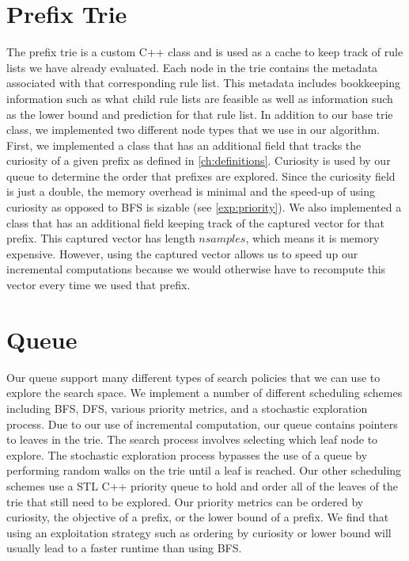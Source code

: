 \section{Prefix Trie}
The prefix trie is a custom C++ class and is used as a cache to keep track of rule lists we have already evaluated. 
Each node in the trie contains the metadata associated with that corresponding rule list. 
This metadata includes bookkeeping information such as what child rule lists are feasible as well as information such as the lower bound and prediction for that rule list.
In addition to our base trie class, we implemented two different node types that we use in our algorithm.
First, we implemented a class that has an additional field that tracks the curiosity of a given prefix as defined in \ref{ch:definitions}.
Curiosity is used by our queue to determine the order that prefixes are explored.
Since the curiosity field is just a double, the memory overhead is minimal and the speed-up of using curiosity as opposed to BFS is sizable (see \ref{exp:priority}).
We also implemented a class that has an additional field keeping track of the captured vector for that prefix.
This captured vector has length $nsamples$, which means it is memory expensive.
However, using the captured vector allows us to speed up our incremental computations because we would otherwise have to recompute this vector every time we used that prefix.

\section{Queue}\label{sec:queue}
Our queue support many different types of search policies that we can use to explore the search space.
We implement a number of different scheduling schemes including BFS, DFS, various priority metrics, and a stochastic exploration process.
Due to our use of incremental computation, our queue contains pointers to leaves in the trie.
The search process involves selecting which leaf node to explore.
The stochastic exploration process bypasses the use of a queue by performing random walks on the trie until a leaf is reached.
Our other scheduling schemes use a STL C++ priority queue to hold and order all of the leaves of the trie that still need to be explored.
Our priority metrics can be ordered by curiosity, the objective of a prefix, or the lower bound of a prefix.
We find that using an exploitation strategy such as ordering by curiosity or lower bound will usually lead to a faster runtime than using BFS.

